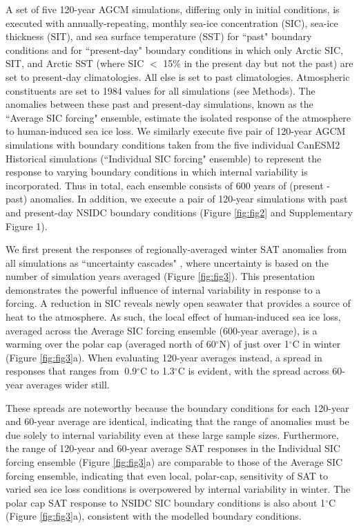 \documentclass{nature}
\begin{document}
A set of five 120-year AGCM simulations, differing only in initial conditions, is executed with annually-repeating, monthly sea-ice concentration (SIC), sea-ice thickness (SIT), and sea surface temperature (SST) for ``past" boundary conditions and for ``present-day" boundary conditions in which only Arctic SIC, SIT, and Arctic SST (where SIC $<$ 15\% in the present day but not the past) are set to present-day climatologies. All else is set to past climatologies. Atmospheric constituents are set to 1984 values for all simulations (see Methods). The anomalies between these past and present-day simulations, known as the ``Average SIC forcing" ensemble, estimate the isolated response of the atmosphere to human-induced sea ice loss. We similarly execute five pair of 120-year AGCM simulations with boundary conditions taken from the five individual CanESM2 Historical simulations (``Individual SIC forcing" ensemble) to represent the response to varying boundary conditions in which internal variability is incorporated. Thus in total, each ensemble consists of 600 years of (present - past) anomalies. In addition, we execute a pair of 120-year simulations with past and present-day NSIDC boundary conditions (Figure \ref{fig:fig2} and Supplementary Figure 1).

We first present the responses of regionally-averaged winter SAT anomalies from all simulations as ``uncertainty cascades" \cite{wilby10,swart15}, where uncertainty is based on the number of simulation years averaged (Figure \ref{fig:fig3}). This presentation demonstrates the powerful influence of internal variability in response to a forcing. A reduction in SIC reveals newly open seawater that provides a source of heat to the atmosphere. As such, the local effect of human-induced sea ice loss, averaged across the Average SIC forcing ensemble (600-year average), is a warming over the polar cap (averaged north of 60$^\circ$N) of just over 1$^\circ$C in winter (Figure \ref{fig:fig3}a). When evaluating 120-year averages instead, a spread in responses that ranges from $~$0.9$^\circ$C to 1.3$^\circ$C is evident, with the spread across 60-year averages wider still. 

These spreads are noteworthy because the boundary conditions for each 120-year and 60-year average are identical, indicating that the range of anomalies must be due solely to internal variability even at these large sample sizes. Furthermore, the range of 120-year and 60-year average SAT responses in the Individual SIC forcing ensemble (Figure \ref{fig:fig3}a) are comparable to those of the Average SIC forcing ensemble, indicating that even local, polar-cap, sensitivity of SAT to varied sea ice loss conditions is overpowered by internal variability in winter. The polar cap SAT response to NSIDC SIC boundary conditions is also about 1$^\circ$C (Figure \ref{fig:fig3}a), consistent with the modelled boundary conditions.   
\end{document}
